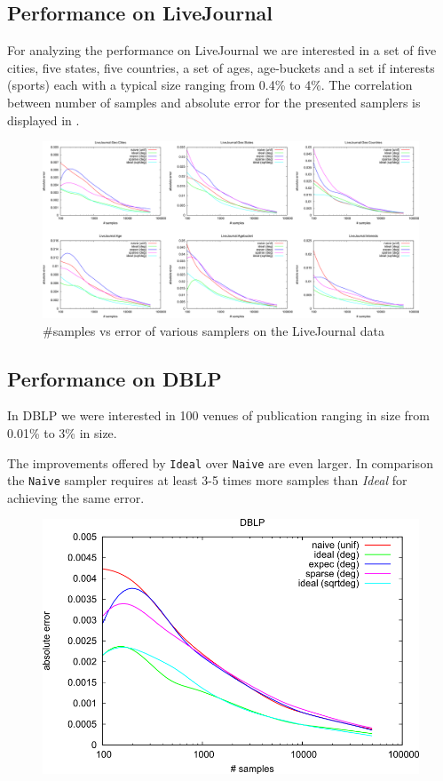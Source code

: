 \subsection{Performance on LiveJournal}
For analyzing the performance on LiveJournal we are interested in a set of five cities, five states, five countries, a set of ages, age-buckets and a set if interests (sports) each with a typical size ranging from 0.4\% to 4\%.
The correlation between number of samples and absolute error for the presented samplers is displayed in . 
\begin{figure}[!ht]
  \begin{center}
    \includegraphics[width=\linewidth]{fig2_3}
    \caption{\#samples vs error of various samplers on the LiveJournal data}
  \end{center}
\end{figure}
\subsection{Performance on DBLP}
In DBLP we were interested in 100 venues of publication ranging in size from 0.01\% to 3\% in size.

The improvements offered by \texttt{Ideal} over \texttt{Naive} are even larger. In comparison the \texttt{Naive} sampler requires at least 3-5 times more samples than \textit{Ideal} for achieving the same error.
\begin{figure}[!ht]
  \begin{center}
    \includegraphics[width=0.5\linewidth]{fig4}
  \end{center}
\end{figure}
